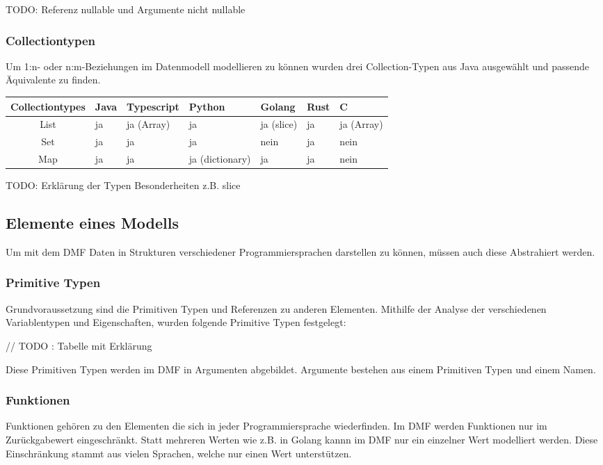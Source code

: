 \documentclass[./einleitung.tex]{subfiles}
\begin{document}
TODO:
Referenz nullable und Argumente nicht nullable

\subsubsection{Collectiontypen}
Um 1:n- oder n:m-Beziehungen im Datenmodell modellieren zu können wurden drei Collection-Typen aus Java ausgewählt und passende Äquivalente zu finden.
\begin{center}
\begin{tabular}{| c || m{3em} | m{4.5em} | m{5.5em} | m{4.5em} | m{3em} | m{4.5em} |}
\hline
Collectiontypes & Java & Typescript & Python & Golang & Rust & C \\
\hline
List & ja & ja (Array) & ja & ja (slice) & ja & ja (Array) \\
\hline
Set & ja & ja & ja & nein & ja & nein \\
\hline
Map & ja & ja & ja (dictionary)& ja & ja & nein \\
\hline

\end{tabular}
\end{center}

TODO: Erklärung der Typen
Besonderheiten z.B. slice

\subsection{Elemente eines Modells}
Um mit dem DMF Daten in Strukturen verschiedener Programmiersprachen darstellen zu können, müssen auch diese Abstrahiert werden.

\subsubsection{Primitive Typen}
Grundvoraussetzung sind die Primitiven Typen und Referenzen zu anderen Elementen.
Mithilfe der Analyse der verschiedenen Variablentypen und Eigenschaften, wurden folgende Primitive Typen festgelegt:

// TODO : Tabelle mit Erklärung

Diese Primitiven Typen werden im DMF in Argumenten abgebildet. Argumente bestehen aus einem Primitiven Typen und einem Namen.

\subsubsection{Funktionen}
Funktionen gehören zu den Elementen die sich in jeder Programmiersprache wiederfinden.
Im DMF werden Funktionen nur im Zurückgabewert eingeschränkt. Statt mehreren Werten wie z.B. in Golang kannn im DMF nur ein einzelner Wert modelliert werden. Diese Einschränkung stammt aus vielen Sprachen, welche nur einen Wert unterstützen.
\end{document}
